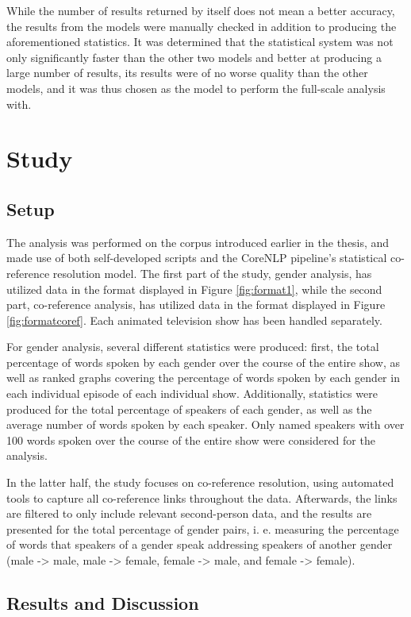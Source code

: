 \documentclass[a4paper, 11pt]{article}
\begin{document}
While the number of results returned by itself does not mean a better accuracy, the results from the models were manually checked in addition to producing the aforementioned statistics. It was determined that the statistical system was not only significantly faster than the other two models and better at producing a large number of results, its results were of no worse quality than the other models, and it was thus chosen as the model to perform the full-scale analysis with.

\section{Study}

\subsection{Setup}
The analysis was performed on the corpus introduced earlier in the thesis, and made use of both self-developed scripts and the CoreNLP pipeline's statistical co-reference resolution model. The first part of the study, gender analysis, has utilized data in the format displayed in Figure \ref{fig:format1}, while the second part, co-reference analysis, has utilized data in the format displayed in Figure \ref{fig:formatcoref}. Each animated television show has been handled separately.

For gender analysis, several different statistics were produced: first, the total percentage of words spoken by each gender over the course of the entire show, as well as ranked graphs covering the percentage of words spoken by each gender in each individual episode of each individual show. Additionally, statistics were produced for the total percentage of speakers of each gender, as well as the average number of words spoken by each speaker. Only named speakers with over 100 words spoken over the course of the entire show were considered for the analysis.

In the latter half, the study focuses on co-reference resolution, using automated tools to capture all co-reference links throughout the data. Afterwards, the links are filtered to only include relevant second-person data, and the results are presented for the total percentage of gender pairs, i. e. measuring the percentage of words that speakers of a gender speak addressing speakers of another gender (male -> male, male -> female, female -> male, and female -> female).

\subsection{Results and Discussion}
\end{document}
